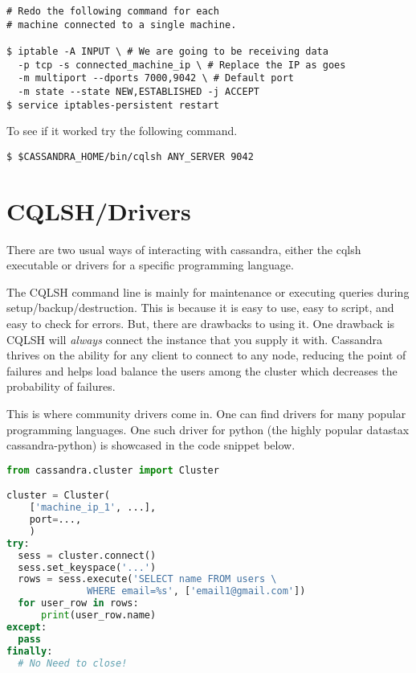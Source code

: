 \documentclass[9pt,twocolumn,twoside]{idsi}
\begin{document}
\begin{lstlisting}[breaklines]
# Redo the following command for each
# machine connected to a single machine.

$ iptable -A INPUT \ # We are going to be receiving data
  -p tcp -s connected_machine_ip \ # Replace the IP as goes
  -m multiport --dports 7000,9042 \ # Default port
  -m state --state NEW,ESTABLISHED -j ACCEPT
$ service iptables-persistent restart
\end{lstlisting}

To see if it worked try the following command.

\begin{lstlisting}[breaklines]
$ $CASSANDRA_HOME/bin/cqlsh ANY_SERVER 9042
\end{lstlisting}


\section{CQLSH/Drivers}

There are two usual ways of interacting with cassandra, either the cqlsh executable or drivers for a specific programming language.

The CQLSH command line is mainly for maintenance or executing queries during setup/backup/destruction. This is because it is easy to use, easy to script, and easy to check for errors. But, there are drawbacks to using it. One drawback is CQLSH will \textit{always} connect the instance that you supply it with. Cassandra thrives on the ability for any client to connect to any node, reducing the point of failures and helps load balance the users among the cluster which decreases the probability of failures.

This is where community drivers come in. One can find drivers for many popular programming languages. One such driver for python (the highly popular datastax cassandra-python) is showcased in the code snippet below.

\begin{lstlisting}[language=Python]
from cassandra.cluster import Cluster

cluster = Cluster(
    ['machine_ip_1', ...],
    port=...,
    )
try:
  sess = cluster.connect()
  sess.set_keyspace('...')
  rows = sess.execute('SELECT name FROM users \
              WHERE email=%s', ['email1@gmail.com'])
  for user_row in rows:
      print(user_row.name)
except:
  pass
finally:
  # No Need to close!
\end{lstlisting}
\end{document}
